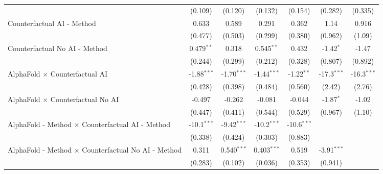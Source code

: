 \begin{tabular}{lcccccc}
                                                              & (0.109)        & (0.120)        & (0.132)        & (0.154)        & (0.282)       & (0.335)\\   
   Counterfactual AI - Method                                 & 0.633          & 0.589          & 0.291          & 0.362          & 1.14          & 0.916\\   
                                                              & (0.477)        & (0.503)        & (0.299)        & (0.380)        & (0.962)       & (1.09)\\   
   Counterfactual No AI - Method                              & 0.479$^{**}$   & 0.318          & 0.545$^{**}$   & 0.432          & -1.42$^{*}$   & -1.47\\   
                                                              & (0.244)        & (0.299)        & (0.212)        & (0.328)        & (0.807)       & (0.892)\\   
   AlphaFold $\times$ Counterfactual AI                       & -1.88$^{***}$  & -1.70$^{***}$  & -1.44$^{***}$  & -1.22$^{**}$   & -17.3$^{***}$ & -16.3$^{***}$\\   
                                                              & (0.428)        & (0.398)        & (0.484)        & (0.560)        & (2.42)        & (2.76)\\   
   AlphaFold $\times$ Counterfactual No AI                    & -0.497         & -0.262         & -0.081         & -0.044         & -1.87$^{*}$   & -1.02\\   
                                                              & (0.447)        & (0.411)        & (0.544)        & (0.529)        & (0.967)       & (1.10)\\   
   AlphaFold - Method $\times$ Counterfactual AI - Method     & -10.1$^{***}$  & -9.42$^{***}$  & -10.2$^{***}$  & -10.6$^{***}$  &               &   \\   
                                                              & (0.338)        & (0.424)        & (0.303)        & (0.883)        &               &   \\   
   AlphaFold - Method $\times$ Counterfactual No AI - Method  & 0.311          & 0.540$^{***}$  & 0.403$^{***}$  & 0.519          & -3.91$^{***}$ &   \\   
                                                              & (0.283)        & (0.102)        & (0.036)        & (0.353)        & (0.941)       &   \\   
   \midrule

\end{tabular}
